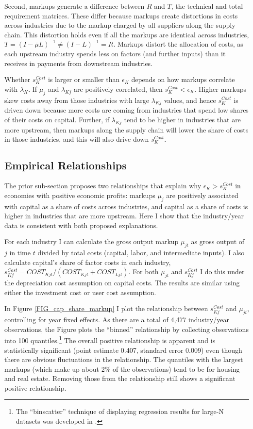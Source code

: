 \documentclass[11pt]{article}
\begin{document}
Second, markups generate a difference between $R$ and $T$, the technical and total requirement matrices. These differ because markups create distortions in costs across industries due to the markup charged by all suppliers along the supply chain. This distortion holds even if all the markups are identical across industries, $T = (I - \overline{\mu}L)^{-1} \neq (I - L)^{-1} = R$. Markups distort the allocation of costs, as each upstream industry spends less on factors (and further inputs) than it receives in payments from downstream industries. 

Whether $s_K^{Cost}$ is larger or smaller than $\epsilon_K$ depends on how markups correlate with $\lambda_K$. If $\mu_j$ and $\lambda_{Kj}$ are positively correlated, then $s_K^{Cost} < \epsilon_K$. Higher markups skew costs away from those industries with large $\lambda_{Kj}$ values, and hence $s_K^{Cost}$ is driven down because more costs are coming from industries that spend low shares of their costs on capital. Further, if $\lambda_{Kj}$ tend to be higher in industries that are more upstream, then markups along the supply chain will lower the share of costs in those industries, and this will also drive down $s_K^{Cost}$. 

\subsection{Empirical Relationships}
The prior sub-section proposes two relationships that explain why $\epsilon_K > s_K^{Cost}$ in economies with positive economic profits: markups $\mu_j$ are positively associated with capital as a share of costs across industries, and capital as a share of costs is higher in industries that are more upstream. Here I show that the industry/year data is consistent with both proposed explanations.

For each industry I can calculate the gross output markup $\mu_{jt}$ as gross output of $j$ in time $t$ divided by total costs (capital, labor, and intermediate inputs). I also calculate capital's share of factor costs in each industry, $s_{Kj}^{Cost} = COST_{Kjt}/(COST_{Kjt} + COST_{Ljt})$. For both $\mu_{jt}$ and $s_{Kj}^{Cost}$ I do this under the depreciation cost assumption on capital costs. The results are similar using either the investment cost or user cost assumption.

In Figure \ref{FIG_cap_share_markup} I plot the relationship between $s_{Kj}^{Cost}$ and $\mu_{jt}$, controlling for year fixed effects. As there are a total of 4,477 industry/year observations, the Figure plots the ``binned'' relationship by collecting observations into 100 quantiles.\footnote{The ``binscatter'' technique of displaying regression results for large-N datasets was developed in \cite{cfs2013}.} The overall positive relationship is apparent and is statistically significant (point estimate 0.407, standard error 0.009) even though there are obvious fluctuations in the relationship. The quantiles with the largest markups (which make up about 2\% of the observations) tend to be for housing and real estate. Removing those from the relationship still shows a significant positive relationship.
\end{document}
